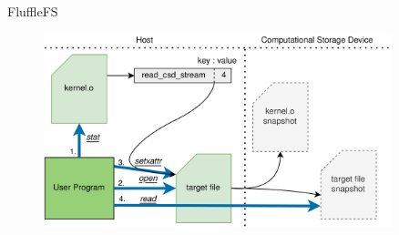 \documentclass{beamer}
\begin{document}
\begin{frame}{FluffleFS}
	\begingroup
	\small %
	\begin{figure}
		\centering
		\includegraphics[width=0.9\textwidth]{resources/images/offloading.png}
	\end{figure}
	\endgroup
\end{frame}
\end{document}
